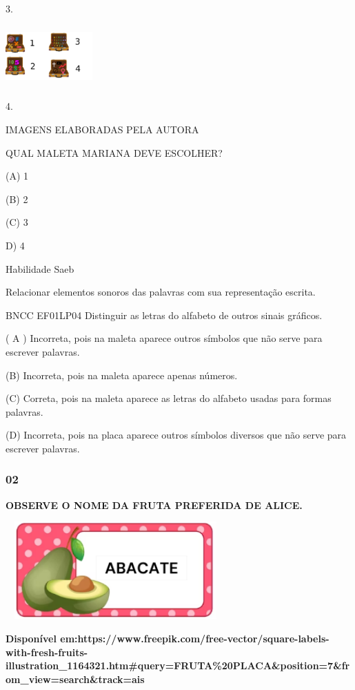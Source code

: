 \begin{escola}
3.

\includegraphics[width=1.31218in,height=0.92930in]{media/image209.png}

4.

IMAGENS ELABORADAS PELA AUTORA

QUAL MALETA MARIANA DEVE ESCOLHER?

(A) 1

(B) 2

(C) 3

D) 4

Habilidade Saeb

Relacionar elementos sonoros das palavras com sua representação escrita.

BNCC EF01LP04 Distinguir as letras do alfabeto de outros sinais
gráficos.

( A ) Incorreta, pois na maleta aparece outros símbolos que não serve
para escrever palavras.

(B) Incorreta, pois na maleta aparece apenas números.

(C) Correta, pois na maleta aparece as letras do alfabeto usadas para
formas palavras.

(D) Incorreta, pois na placa aparece outros símbolos diversos que não
serve para escrever palavras.

\subsubsection{02}\label{section-42}

\textbf{OBSERVE O NOME DA FRUTA PREFERIDA DE ALICE.}

\includegraphics[width=3.32292in,height=1.46928in]{media/image212.png}

\textbf{Disponível
em:https://www.freepik.com/free-vector/square-labels-with-fresh-fruits-illustration\_1164321.htm\#query=FRUTA\%20PLACA\&position=7\&from\_view=search\&track=ais}


\end{escola}
